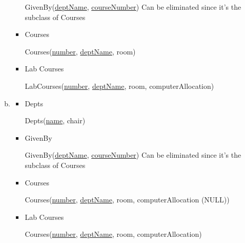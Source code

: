\documentclass[12pt]{article}
\begin{document}
\begin{enumerate}[1.]
\begin{enumerate}[a)]
\begin{itemize}
            \quad GivenBy(\underline{deptName}, \underline{courseNumber}) \color{red}Can be eliminated since it's the subclass of Courses\color{black}

            \bigskip

            \item Courses

            \bigskip

            \quad Courses(\underline{number}, \underline{deptName}, room)

            \bigskip

            \item Lab Courses

            \bigskip

            \quad LabCourses(\underline{number}, \underline{deptName}, room, computerAllocation)

            \bigskip
        \end{itemize}

        \item

        \begin{itemize}
            \item Depts

            \bigskip

            \quad Depts(\underline{name}, chair)

            \bigskip

            \item GivenBy

            \bigskip

            \quad GivenBy(\underline{deptName}, \underline{courseNumber}) \color{red}Can be eliminated since it's the subclass of Courses\color{black}

            \bigskip

            \item Courses

            \bigskip

            \quad Courses(\underline{number}, \underline{deptName}, room, computerAllocation (NULL))

            \bigskip

            \item Lab Courses

            \bigskip

            \quad Courses(\underline{number}, \underline{deptName}, room, computerAllocation)


\end{itemize}
\end{enumerate}
\end{enumerate}
\end{document}
